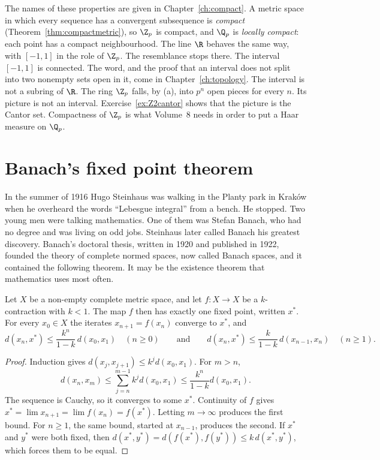 The names of these properties are given in Chapter~\ref{ch:compact}. A metric space in which every sequence has a convergent subsequence is \emph{compact} (Theorem~\ref{thm:compactmetric}), so $\Z_p$ is compact, and $\Q_p$ is \emph{locally compact}: each point has a compact neighbourhood. The line $\R$ behaves the same way, with $[-1,1]$ in the role of $\Z_p$. The resemblance stops there. The interval $[-1,1]$ is connected. The word, and the proof that an interval does not split into two nonempty sets open in it, come in Chapter~\ref{ch:topology}. The interval is not a subring of $\R$. The ring $\Z_p$ falls, by (a), into $p^n$ open pieces for every $n$. Its picture is not an interval. Exercise~\ref{ex:Z2cantor} shows that the picture is the Cantor set. Compactness of $\Z_p$ is what Volume~8 needs in order to put a Haar measure on $\Q_p$.

\section{Banach's fixed point theorem}

In the summer of 1916 Hugo Steinhaus was walking in the Planty park in Krak\'ow when he overheard the words ``Lebesgue integral'' from a bench. He stopped. Two young men were talking mathematics. One of them was Stefan Banach, who had no degree and was living on odd jobs. Steinhaus later called Banach his greatest discovery. Banach's doctoral thesis, written in 1920 and published in 1922, founded the theory of complete normed spaces, now called Banach spaces, and it contained the following theorem. It may be the existence theorem that mathematics uses most often.

\begin{theorem}[Banach, 1922]\label{thm:banach}
Let $X$ be a non-empty complete metric space, and let $f:X\to X$ be a $k$-contraction with $k<1$. The map $f$ then has exactly one fixed point, written $x^*$. For every $x_0\in X$ the iterates $x_{n+1}=f(x_n)$ converge to $x^*$, and
\[
d(x_n,x^*)\le\frac{k^n}{1-k}\,d(x_0,x_1)\quad(n\ge 0)\qquad\text{and}\qquad d(x_n,x^*)\le\frac k{1-k}\,d(x_{n-1},x_n)\quad(n\ge 1).
\]
\end{theorem}
\begin{proof}
Induction gives $d(x_j,x_{j+1})\le k^jd(x_0,x_1)$. For $m>n$,
\[
d(x_n,x_m)\le\sum_{j=n}^{m-1}k^jd(x_0,x_1)\le\frac{k^n}{1-k}d(x_0,x_1).
\]
The sequence is Cauchy, so it converges to some $x^*$. Continuity of $f$ gives $x^*=\lim x_{n+1}=\lim f(x_n)=f(x^*)$. Letting $m\to\infty$ produces the first bound. For $n\ge 1$, the same bound, started at $x_{n-1}$, produces the second. If $x^*$ and $y^*$ were both fixed, then $d(x^*,y^*)=d(f(x^*),f(y^*))\le k\,d(x^*,y^*)$, which forces them to be equal.
\end{proof}

